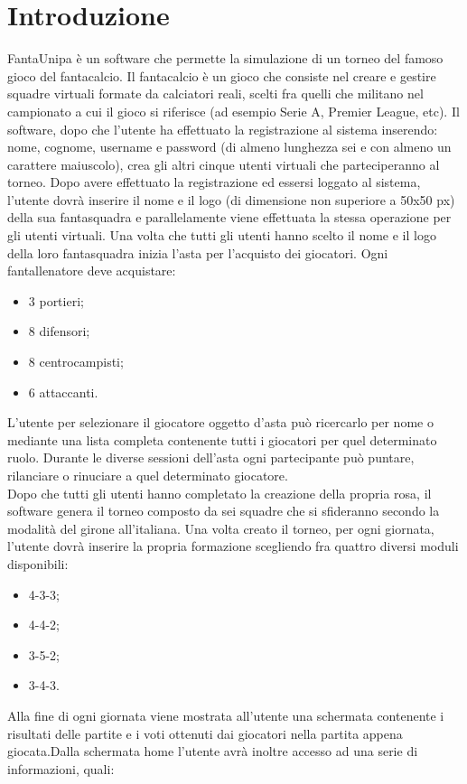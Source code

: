 \documentclass[12pt,a4paper]{article}
\begin{document}
\section{Introduzione}
FantaUnipa è un software che permette la simulazione di un torneo del famoso gioco del fantacalcio. Il fantacalcio è un gioco che consiste nel creare e gestire squadre virtuali formate da calciatori reali, scelti fra quelli che militano nel campionato a cui il gioco si riferisce (ad esempio Serie A, Premier League, etc). Il software, dopo che l'utente ha effettuato la registrazione al sistema inserendo: nome, cognome, username e password (di almeno lunghezza sei e con almeno un carattere maiuscolo), crea gli altri cinque utenti virtuali che parteciperanno al torneo.
Dopo avere effettuato la registrazione ed essersi loggato al sistema,  l'utente dovrà inserire il nome e il logo (di dimensione non superiore a 50x50 px) della sua fantasquadra e parallelamente viene effettuata la stessa operazione per gli utenti virtuali. Una volta che tutti gli utenti hanno scelto il nome e il logo della loro fantasquadra inizia l'asta per l'acquisto dei giocatori. Ogni fantallenatore deve acquistare:
\begin{itemize}
\item 3 portieri;
\item 8 difensori;
\item 8 centrocampisti;
\item 6 attaccanti.
\end{itemize}
L'utente per selezionare il giocatore oggetto d'asta può ricercarlo per nome o mediante una lista completa contenente tutti i giocatori per quel determinato ruolo.
Durante le diverse sessioni dell'asta ogni partecipante può puntare, rilanciare o rinuciare a quel determinato giocatore.\\
Dopo che tutti gli utenti hanno completato la creazione della propria rosa, il software genera il torneo composto da sei squadre che si sfideranno secondo la modalità del girone all'italiana.
Una volta creato il torneo, per ogni giornata, l'utente dovrà inserire la propria formazione scegliendo fra quattro diversi moduli disponibili:
\begin{itemize}
\item 4-3-3;
\item 4-4-2;
\item 3-5-2;
\item 3-4-3.
\end{itemize}
Alla fine di ogni giornata viene mostrata all'utente una schermata contenente i risultati delle partite e i voti ottenuti dai giocatori nella partita appena giocata.Dalla schermata home l'utente avrà inoltre accesso ad una serie di informazioni, quali:
\end{document}
